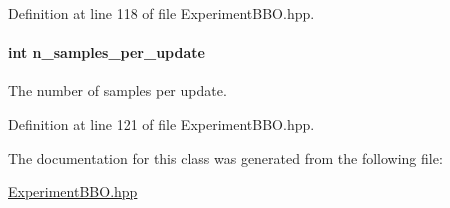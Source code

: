 Definition at line 118 of file Experiment\+B\+B\+O.\+hpp.

\hypertarget{classDmpBbo_1_1ExperimentBBO_a4fb03395f917e6fa1917a01cc3c07e2a}{
\paragraph[{n\+\_\+samples\+\_\+per\+\_\+update}]{\setlength{\rightskip}{0pt plus 5cm}int n\+\_\+samples\+\_\+per\+\_\+update}}\label{classDmpBbo_1_1ExperimentBBO_a4fb03395f917e6fa1917a01cc3c07e2a}


The number of samples per update. 



Definition at line 121 of file Experiment\+B\+B\+O.\+hpp.



The documentation for this class was generated from the following file\+:\begin{DoxyCompactItemize}
\item 
\hyperlink{ExperimentBBO_8hpp}{Experiment\+B\+B\+O.\+hpp}\end{DoxyCompactItemize}
